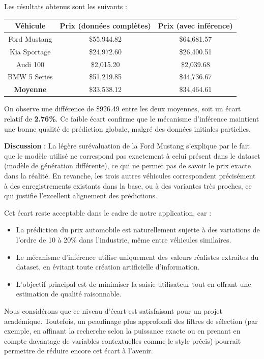 \documentclass[12pt]{report}
\begin{document}
Les résultats obtenus sont les suivants :

\begin{center}
\begin{tabular}{|c|c|c|}
\hline
\textbf{Véhicule} & \textbf{Prix (données complètes)} & \textbf{Prix (avec inférence)} \\
\hline
Ford Mustang & \$55,944.82 & \$64,681.57 \\
Kia Sportage & \$24,972.60 & \$26,400.51 \\
Audi 100 & \$2,015.20 & \$2,039.68 \\
BMW 5 Series & \$51,219.85 & \$44,736.67 \\
\hline
\textbf{Moyenne} & \$33,538.12 & \$34,464.61 \\
\hline
\end{tabular}
\end{center}

On observe une différence de \$926.49 entre les deux moyennes, soit un écart relatif de \textbf{2.76\%}. Ce faible écart confirme que le mécanisme d'inférence maintient une bonne qualité de prédiction globale, malgré des données initiales partielles. 

\textbf{Discussion} :  
La légère surévaluation de la Ford Mustang s'explique par le fait que le modèle utilisé ne correspond pas exactement à celui présent dans le dataset (modèle de génération différente), ce qui ne permet pas de savoir le prix exacte dans la réalité. En revanche, les trois autres véhicules correspondent précisément à des enregistrements existants dans la base, ou à des variantes très proches, ce qui justifie l'excellent alignement des prédictions.

Cet écart reste acceptable dans le cadre de notre application, car :
\begin{itemize}
    \item La prédiction du prix automobile est naturellement sujette à des variations de l'ordre de 10 à 20\% dans l'industrie, même entre véhicules similaires.
    \item Le mécanisme d'inférence utilise uniquement des valeurs réalistes extraites du dataset, en évitant toute création artificielle d'information.
    \item L'objectif principal est de minimiser la saisie utilisateur tout en offrant une estimation de qualité raisonnable.
\end{itemize}

Nous considérons que ce niveau d'écart est satisfaisant pour un projet académique. Toutefois, un peaufinage plus approfondi des filtres de sélection (par exemple, en affinant la recherche selon la puissance exacte ou en prenant en compte davantage de variables contextuelles comme le style précis) pourrait permettre de réduire encore cet écart à l'avenir.
\end{document}
